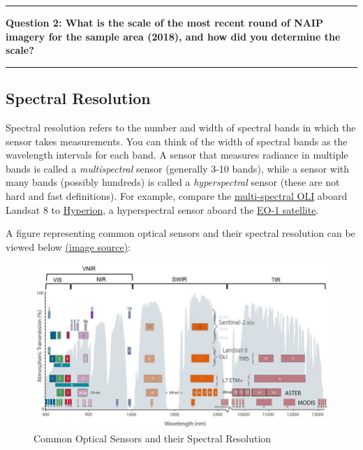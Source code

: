 \documentclass[
]{article}
\begin{document}
\begin{center}\rule{0.5\linewidth}{0.5pt}\end{center}

\textbf{Question 2: What is the scale of the most recent round of NAIP imagery for the sample area (2018), and how did you determine the scale?}

\begin{center}\rule{0.5\linewidth}{0.5pt}\end{center}

\hypertarget{spectral-resolution}{%
\subsection{Spectral Resolution}\label{spectral-resolution}}

Spectral resolution refers to the number and width of spectral bands in which the sensor takes measurements. You can think of the width of spectral bands as the wavelength intervals for each band. A sensor that measures radiance in multiple bands is called a \emph{multispectral} sensor (generally 3-10 bands), while a sensor with many bands (possibly hundreds) is called a \emph{hyperspectral} sensor (these are not hard and fast definitions). For example, compare the \href{http://landsat.gsfc.nasa.gov/?p=5779}{multi-spectral OLI} aboard Landsat 8 to \href{https://eo1.usgs.gov/sensors/hyperioncoverage}{Hyperion}, a hyperspectral sensor aboard the \href{https://eo1.usgs.gov/}{EO-1 satellite}.

A figure representing common optical sensors and their spectral resolution can be viewed below \href{https://www.researchgate.net/figure/Spectral-resolution-of-currently-available-optical-satellite-sensors-grouped-by-different_fig1_348695518}{(image source)}:

\begin{figure}

{\centering \includegraphics[width=1\linewidth]{common_optical_sensors_spectral_resolution} 

}

\caption{Common Optical Sensors and their Spectral Resolution}\label{fig:spectralres}
\end{figure}
\end{document}

